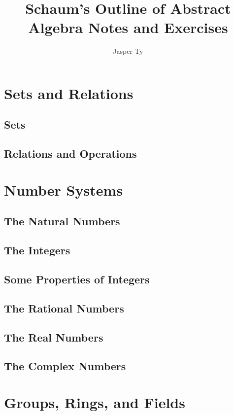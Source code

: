 \documentclass{book}
\begin{document}
\title{Schaum's Outline of Abstract Algebra Notes and Exercises}
\author{Jasper Ty}
\date{}
\maketitle

\tableofcontents

\part{Sets and Relations}
\chapter{Sets}




\chapter{Relations and Operations}


\part{Number Systems}
\chapter{The Natural Numbers}
\chapter{The Integers}
\chapter{Some Properties of Integers}
\chapter{The Rational Numbers}
\chapter{The Real Numbers}
\chapter{The Complex Numbers}

\part{Groups, Rings, and Fields}
\end{document}
